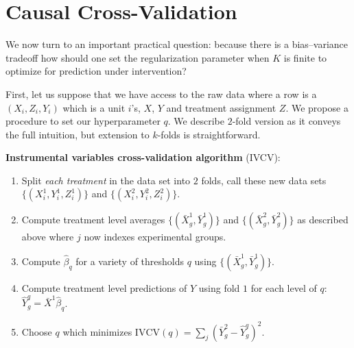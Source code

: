 \documentclass{article}
\newcommand\Var{\text{Var}}
\newcommand\Cov{\text{Cov}}
\begin{document}

\section{Causal Cross-Validation}
We now turn to an important practical question: because there is a bias--variance tradeoff how should one set the regularization parameter when $K$ is finite to optimize for prediction under intervention? 

First, let us suppose that we have access to the raw data where a row is a $(X_i, Z_i, Y_i)$ which is a unit $i$'s, $X$, $Y$ and treatment assignment $Z.$ We propose a procedure to set our hyperparameter $q$. We describe $2$-fold version as it conveys the full intuition, but extension to $k$-folds is straightforward. 

\textbf{Instrumental variables cross-validation algorithm} (IVCV):
\begin{enumerate}
\item Split \textit{each treatment} in the data set into $2$ folds, call these new data sets $\lbrace (X^1_i, Y^1_i, Z^1_i) \rbrace$ and $\lbrace  (X^2_i, Y^2_i, Z^2_i) \rbrace$.
\item Compute treatment level averages $\lbrace (\bar{X}^1_g, \bar{Y}^1_g) \rbrace$ and $\lbrace (\bar{X}^2_g, \bar{Y}^2_g) \rbrace$ as described above where $j$ now indexes experimental groups.
\item Compute $\hat{\beta}_{q}$ for a variety of thresholds $q$ using $\lbrace (\bar{X}^1_g, \bar{Y}^1_g) \rbrace$.
\item Compute treatment level predictions of $Y$ using fold $1$ for each level of $q$: $\hat{Y}^q_g = \bar{X}^1 \hat{\beta}_q$.
\item Choose $q$ which minimizes $\text{IVCV}(q) = \sum_{j} (\bar{Y}^2_g - \hat{Y}^q_g)^2.$
\end{enumerate}
\end{document}
